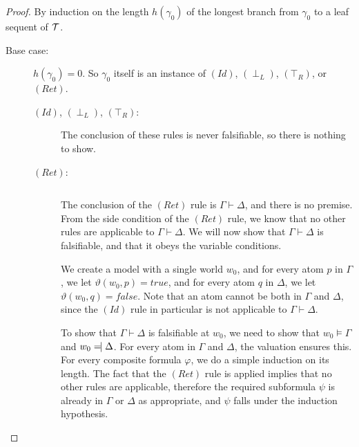 \documentclass{llncs}
\numberwithin{equation}{section}
\newcommand{\sequent}{\vdash}
\newcommand{\Force}{\vDash}
\def\Reject{=\joinrel\mathrel|}
\newcommand{\Bottom}{\perp}
\newcommand{\Top}{\top}
\newcommand{\mycal}[1]{
        {\cal{#1}}
}
\newcommand{\tree}[1]{
        {\mycal{#1}}
}
\newcommand{\IdRule}{(Id)}
\newcommand{\FalseLeftRule}{(\Bottom_L)}
\newcommand{\TrueRightRule}{(\Top_R)}
\newcommand{\ReturnRule}{(Ret)}
\begin{document}
\begin{proof}
By induction on the length $h(\gamma_0)$ of the longest branch from $\gamma_0$ to a leaf sequent of $\tree{T}$.
\begin{description}
	\item[Base case:] $h(\gamma_0) = 0$. So $\gamma_0$ itself is an instance of $\IdRule$, $\FalseLeftRule$, $\TrueRightRule$, or $\ReturnRule$.
		\begin{description}
			\item[$\IdRule$, $\FalseLeftRule$, $\TrueRightRule$:] The conclusion of these rules is never falsifiable, so there is nothing to show.
			
			\item[$\ReturnRule$:] $ $

		The conclusion of the $\ReturnRule$ rule is $\Gamma \sequent \Delta$, and there is no premise. From the side condition of the $\ReturnRule$ rule, we know that no other rules are applicable to $\Gamma \sequent \Delta$. We will now show that $\Gamma \sequent \Delta$ is falsifiable, and that it obeys the variable conditions. 
			
			We create a model with a single world $w_0$, and for every atom $p$ in $\Gamma$, we let $\vartheta(w_0,p) = true$, and for every atom $q$ in $\Delta$, we let $\vartheta(w_0,q) = false$. Note that an atom cannot be both in $\Gamma$ and $\Delta$, since the $\IdRule$ rule in particular is not applicable to $\Gamma \sequent \Delta$.
			
			To show that $\Gamma \sequent \Delta$ is falsifiable at $w_0$, we need to show that $w_0 \Force \Gamma$ and $w_0 \Reject \Delta$. For every atom in $\Gamma$ and $\Delta$, the valuation ensures this. For every composite formula $\varphi$, we do a simple induction on its length. The fact that the $\ReturnRule$ rule is applied implies that no other rules are applicable, therefore the required subformula $\psi$ is already in $\Gamma$ or $\Delta$ as appropriate, and $\psi$ falls under the induction hypothesis.
			

\end{description}
\end{description}
\end{proof}
\end{document}
